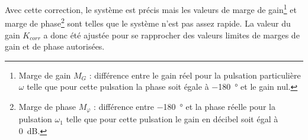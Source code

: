 


%

\medskip
Avec cette correction, le système est précis mais les valeurs de marge de gain\footnote{Marge de gain $M_{G}$ : différence entre le gain réel pour la pulsation particulière $\omega$ telle que pour cette pulsation la phase soit égale à \SI{-180}{\degree} et le gain nul.} et marge de phase\footnote{Marge de phase $M_\varphi$ : différence entre \SI{-180}{\degree} et la phase réelle pour la pulsation $\omega_1$ telle que pour cette pulsation le gain en décibel soit égal à \SI{0}{dB}.} sont telles que le système n'est pas assez rapide. La valeur du gain $K_{corr}$ a donc été ajustée pour se rapprocher des valeurs limites de marges de gain et de phase autorisées.
\medskip

%

